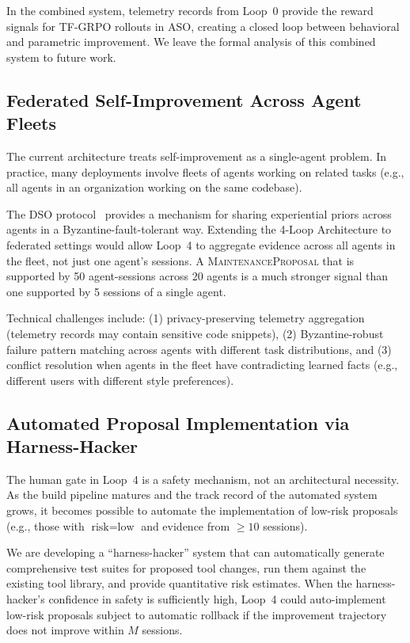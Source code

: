 \documentclass[11pt]{article}
\begin{document}
In the combined system, telemetry records from Loop~0 provide the reward
signals for TF-GRPO rollouts in ASO, creating a closed loop between behavioral
and parametric improvement. We leave the formal analysis of this combined
system to future work.

\subsection{Federated Self-Improvement Across Agent Fleets}

The current architecture treats self-improvement as a single-agent problem.
In practice, many deployments involve fleets of agents working on related
tasks (e.g., all agents in an organization working on the same codebase).

The DSO protocol~\cite{hanzo2026dso} provides a mechanism for sharing
experiential priors across agents in a Byzantine-fault-tolerant way. Extending
the 4-Loop Architecture to federated settings would allow Loop~4 to aggregate
evidence across all agents in the fleet, not just one agent's sessions. A
\textsc{MaintenanceProposal} that is supported by 50 agent-sessions across
20 agents is a much stronger signal than one supported by 5 sessions of a
single agent.

Technical challenges include: (1) privacy-preserving telemetry aggregation
(telemetry records may contain sensitive code snippets), (2) Byzantine-robust
failure pattern matching across agents with different task distributions, and
(3) conflict resolution when agents in the fleet have contradicting learned
facts (e.g., different users with different style preferences).

\subsection{Automated Proposal Implementation via Harness-Hacker}

The human gate in Loop~4 is a safety mechanism, not an architectural necessity.
As the build pipeline matures and the track record of the automated system
grows, it becomes possible to automate the implementation of low-risk proposals
(e.g., those with $\text{risk} = \text{low}$ and evidence from $\geq 10$
sessions).

We are developing a ``harness-hacker'' system that can automatically generate
comprehensive test suites for proposed tool changes, run them against the
existing tool library, and provide quantitative risk estimates. When the
harness-hacker's confidence in safety is sufficiently high, Loop~4 could
auto-implement low-risk proposals subject to automatic rollback if the
improvement trajectory does not improve within $M$ sessions.
\end{document}

